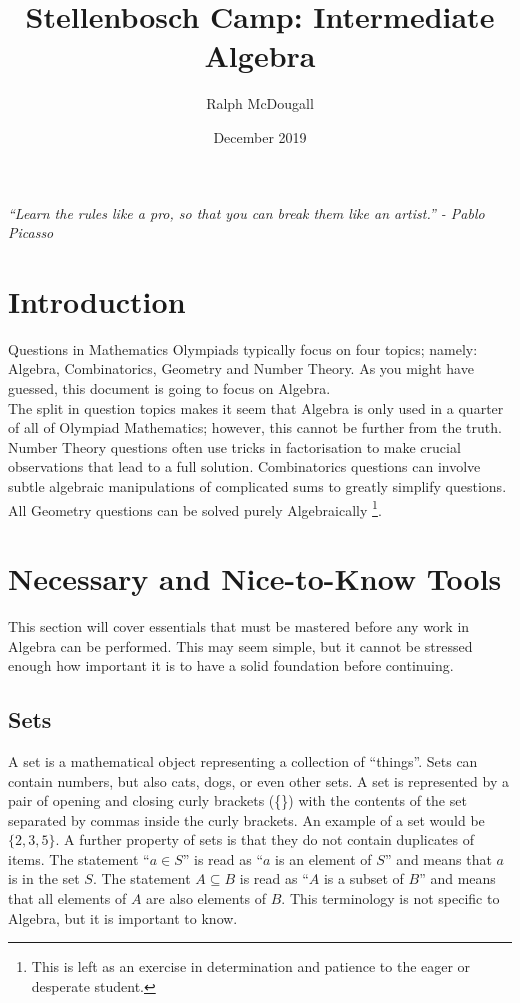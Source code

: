 \documentclass[a4paper,12pt]{article}
\begin{document}
\title{Stellenbosch Camp: Intermediate Algebra}
\author{Ralph McDougall}
\date{December 2019}
\maketitle

\centerline{ \textit{``Learn the rules like a pro, so that you can break them like an artist.'' - Pablo Picasso} }

\section{Introduction}

Questions in Mathematics Olympiads typically focus on four topics; namely: Algebra, Combinatorics, Geometry and Number Theory. As you might have guessed, this document is going to focus on Algebra. \\

The split in question topics makes it seem that Algebra is only used in a quarter of all of Olympiad Mathematics; however, this cannot be further from the truth. Number Theory questions often use tricks in factorisation to make crucial observations that lead to a full solution. Combinatorics questions can involve subtle algebraic manipulations of complicated sums to greatly simplify questions. All Geometry questions can be solved purely Algebraically \footnote{This is left as an exercise in determination and patience to the eager or desperate student.}. \\

\clearpage

\section{Necessary and Nice-to-Know Tools}
This section will cover essentials that must be mastered before any work in Algebra can be performed. This may seem simple, but it cannot be stressed enough how important it is to have a solid foundation before continuing.

\subsection{Sets}
A set is a mathematical object representing a collection of ``things''. Sets can contain numbers, but also cats, dogs, or even other sets. A set is represented by a pair of opening and closing curly brackets (\{\}) with the contents of the set separated by commas inside the curly brackets. An example of a set would be $\{2, 3, 5\}$. A further property of sets is that they do not contain duplicates of items. The statement ``$a \in S$'' is read as ``$a$ is an element of $S$'' and means that $a$ is in the set $S$. The statement $A \subseteq B$ is read as ``$A$ is a subset of $B$'' and means that all elements of $A$ are also elements of $B$. This terminology is not specific to Algebra, but it is important to know.\\
\end{document}
